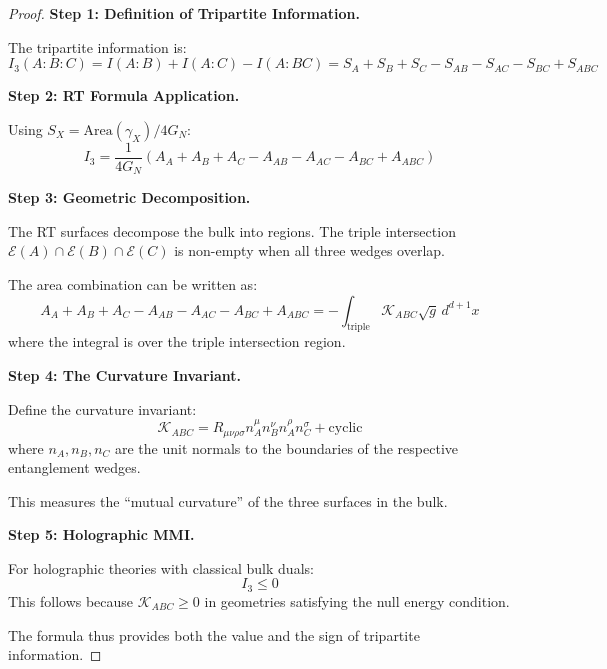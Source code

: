 \documentclass[12pt,a4paper]{article}
\begin{document}
\begin{proof}
\textbf{Step 1: Definition of Tripartite Information.}

The tripartite information is:
\begin{equation}
I_3(A:B:C) = I(A:B) + I(A:C) - I(A:BC) = S_A + S_B + S_C - S_{AB} - S_{AC} - S_{BC} + S_{ABC}
\end{equation}

\textbf{Step 2: RT Formula Application.}

Using $S_X = \text{Area}(\gamma_X)/4G_N$:
\begin{equation}
I_3 = \frac{1}{4G_N}\left( A_A + A_B + A_C - A_{AB} - A_{AC} - A_{BC} + A_{ABC} \right)
\end{equation}

\textbf{Step 3: Geometric Decomposition.}

The RT surfaces decompose the bulk into regions. The triple intersection $\mathcal{E}(A) \cap \mathcal{E}(B) \cap \mathcal{E}(C)$ is non-empty when all three wedges overlap.

The area combination can be written as:
\begin{equation}
A_A + A_B + A_C - A_{AB} - A_{AC} - A_{BC} + A_{ABC} = -\int_{\text{triple}} \mathcal{K}_{ABC} \sqrt{g} \, d^{d+1}x
\end{equation}
where the integral is over the triple intersection region.

\textbf{Step 4: The Curvature Invariant.}

Define the curvature invariant:
\begin{equation}
\mathcal{K}_{ABC} = R_{\mu\nu\rho\sigma} n_A^\mu n_B^\nu n_A^\rho n_C^\sigma + \text{cyclic}
\end{equation}
where $n_A, n_B, n_C$ are the unit normals to the boundaries of the respective entanglement wedges.

This measures the ``mutual curvature'' of the three surfaces in the bulk.

\textbf{Step 5: Holographic MMI.}

For holographic theories with classical bulk duals:
\begin{equation}
I_3 \leq 0
\end{equation}
This follows because $\mathcal{K}_{ABC} \geq 0$ in geometries satisfying the null energy condition.

The formula thus provides both the value and the sign of tripartite information.
\end{proof}
\end{document}
